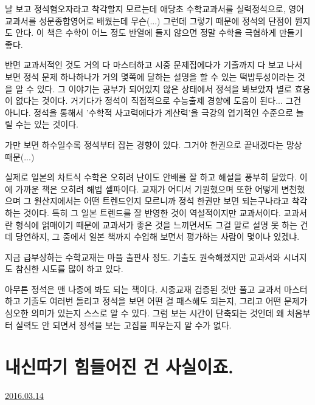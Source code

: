 날 보고 정석혐오자라고 착각할지 모르는데
애당초 수학교과서를 실력정석으로, 영어교과서를 성문종합영어로 배웠는데 무슨(...)
그런데 그렇기 때문에 정석의 단점이 뭔지도 안다. 이 책은 수학이 어느 정도 반열에 들지 않으면 정말 수학을 극혐하게 만들기 좋다.
\vspace{5mm}

반면 교과서적인 것도 거의 다 마스터하고 시중 문제집에다가 기출까지 다 보고 나서 보면
정석 문제 하나하나가 거의 몇쪽에 달하는 설명을 할 수 있는 떡밥투성이라는 것을 알 수 있다.
그 이야기는 공부가 되어있지 않은 상태에서 정석을 봐보았자 별로 효용이 없다는 것이다.
거기다가 정석이 직접적으로 수능출제 경향에 도움이 된다... 그건 아니다.
정석을 통해서 '수학적 사고력에다가 계산력'을 극강의 엽기적인 수준으로 늘릴 수는 있는 것이다.
\vspace{5mm}

가만 보면 하수일수록 정석부터 잡는 경향이 있다. 그거야 한권으로 끝내겠다는 망상 때문(...)
\vspace{5mm}

실제로 일본의 차트식 수학은 오히려 난이도 안배를 잘 하고 해설을 풍부히 달았다. 이에 가까운 책은 오히려 해법 셀파이다.
교재가 어디서 기원했으며 또한 어떻게 변천했으며 그 원산지에서는 어떤 트렌드인지 모르니까 정석 한권만 보면 되는구나라고 착각하는 것이다.
특히 그 일본 트렌드를 잘 반영한 것이 역설적이지만 교과서이다.
교과서란 형식에 얽매이기 때문에 교과서가 좋은 것을 느끼면서도 그걸 말로 설명 못 하는 건데
당연하지, 그 중에서 일본 책까지 수입해 보면서 평가하는 사람이 몇이나 있겠냐.
\vspace{5mm}

지금 급부상하는 수학교재는 마플 출판사 정도. 기출도 원숙해졌지만 교과서와 시너지도 참신한 시도를 많이 하고 있다.
\vspace{5mm}

아무튼 정석은 맨 나중에 봐도 되는 책이다.
시중교재 검증된 것만 풀고 교과서 마스터하고 기출도 여러번 돌리고 정석을 보면
어떤 걸 패스해도 되는지, 그리고 어떤 문제가 심오한 의미가 있는지 스스로 알 수 있다.
그럼 보는 시간이 단축되는 것인데 왜 처음부터 실력도 안 되면서 정석을 보는 고집을 피우는지 알 수가 없다.
\vspace{5mm}









\section{내신따기 힘들어진 건 사실이죠.}
\href{https://www.kockoc.com/Apoc/675938}{2016.03.14}

